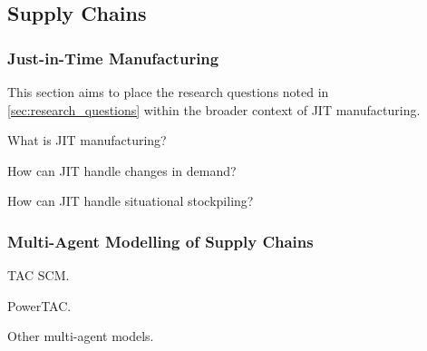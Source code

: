 \subsection{Supply Chains}

\subsubsection{Just-in-Time Manufacturing}

This section aims to place the research questions noted in \cref{sec:research_questions} within the broader context of JIT manufacturing.

What is JIT manufacturing?

How can JIT handle changes in demand?

How can JIT handle situational stockpiling?

\subsubsection{Multi-Agent Modelling of Supply Chains}

TAC SCM\@.

PowerTAC\@.

Other multi-agent models.
